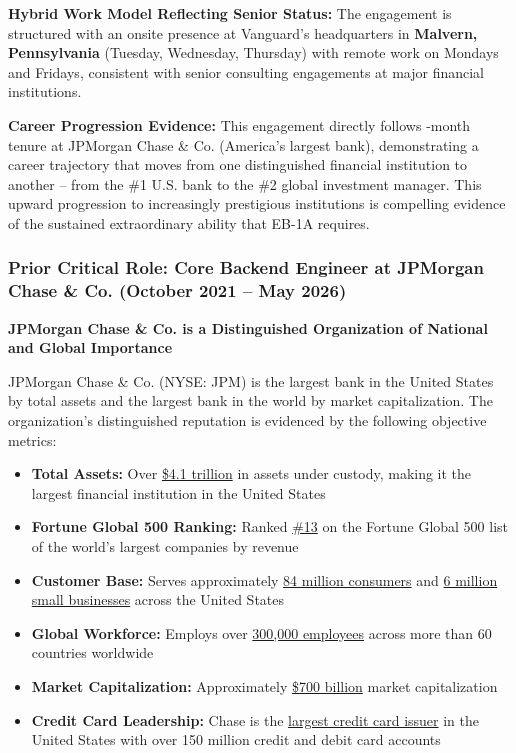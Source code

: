 \textbf{Hybrid Work Model Reflecting Senior Status:} The engagement is structured with an onsite presence at Vanguard's headquarters in \textbf{Malvern, Pennsylvania} (Tuesday, Wednesday, Thursday) with remote work on Mondays and Fridays, consistent with senior consulting engagements at major financial institutions.

\textbf{Career Progression Evidence:} This engagement directly follows -month tenure at JPMorgan Chase \& Co. (America's largest bank), demonstrating a career trajectory that moves from one distinguished financial institution to another -- from the \#1 U.S. bank to the \#2 global investment manager. This upward progression to increasingly prestigious institutions is compelling evidence of the sustained extraordinary ability that EB-1A requires.


\subsubsection{Prior Critical Role: Core Backend Engineer at JPMorgan Chase \& Co. (October 2021 -- May 2026)}
\label{critical:jpmc}

\textbf{JPMorgan Chase \& Co. is a Distinguished Organization of National and Global Importance}

JPMorgan Chase \& Co. (NYSE: JPM) is the largest bank in the United States by total assets and the largest bank in the world by market capitalization. The organization's distinguished reputation is evidenced by the following objective metrics:

\begin{itemize}
    \item \textbf{Total Assets:} Over \underline{\$4.1 trillion} in assets under custody, making it the largest financial institution in the United States
    \item \textbf{Fortune Global 500 Ranking:} Ranked \underline{\#13} on the Fortune Global 500 list of the world's largest companies by revenue
    \item \textbf{Customer Base:} Serves approximately \underline{84 million consumers} and \underline{6 million small businesses} across the United States
    \item \textbf{Global Workforce:} Employs over \underline{300,000 employees} across more than 60 countries worldwide
    \item \textbf{Market Capitalization:} Approximately \underline{\$700 billion} market capitalization
    \item \textbf{Credit Card Leadership:} Chase is the \underline{largest credit card issuer} in the United States with over 150 million credit and debit card accounts
\end{itemize}

